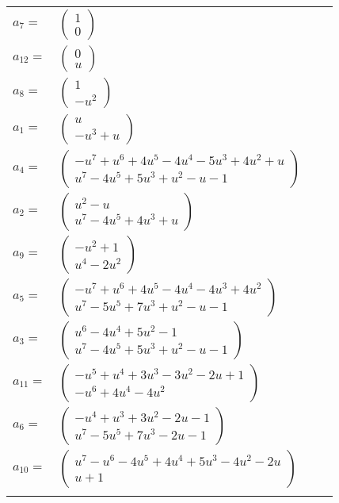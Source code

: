 \documentclass[1p]{elsarticle_modified}
\theoremstyle{definition}
\begin{document}
\begin{tabular}{m{7pt} m{180pt} m{7pt} m{180pt} }
\flushright $a_{7}=$&$\begin{pmatrix}1\\0\end{pmatrix}$ \\
\flushright $a_{12}=$&$\begin{pmatrix}0\\u\end{pmatrix}$ \\
\flushright $a_{8}=$&$\begin{pmatrix}1\\- u^2\end{pmatrix}$ \\
\flushright $a_{1}=$&$\begin{pmatrix}u\\- u^3+u\end{pmatrix}$ \\
\flushright $a_{4}=$&$\begin{pmatrix}- u^7+u^6+4 u^5-4 u^4-5 u^3+4 u^2+u\\u^7-4 u^5+5 u^3+u^2- u-1\end{pmatrix}$ \\
\flushright $a_{2}=$&$\begin{pmatrix}u^2- u\\u^7-4 u^5+4 u^3+u\end{pmatrix}$ \\
\flushright $a_{9}=$&$\begin{pmatrix}- u^2+1\\u^4-2 u^2\end{pmatrix}$ \\
\flushright $a_{5}=$&$\begin{pmatrix}- u^7+u^6+4 u^5-4 u^4-4 u^3+4 u^2\\u^7-5 u^5+7 u^3+u^2- u-1\end{pmatrix}$ \\
\flushright $a_{3}=$&$\begin{pmatrix}u^6-4 u^4+5 u^2-1\\u^7-4 u^5+5 u^3+u^2- u-1\end{pmatrix}$ \\
\flushright $a_{11}=$&$\begin{pmatrix}- u^5+u^4+3 u^3-3 u^2-2 u+1\\- u^6+4 u^4-4 u^2\end{pmatrix}$ \\
\flushright $a_{6}=$&$\begin{pmatrix}- u^4+u^3+3 u^2-2 u-1\\u^7-5 u^5+7 u^3-2 u-1\end{pmatrix}$ \\
\flushright $a_{10}=$&$\begin{pmatrix}u^7- u^6-4 u^5+4 u^4+5 u^3-4 u^2-2 u\\u+1\end{pmatrix}$\\&\end{tabular}
\end{document}
